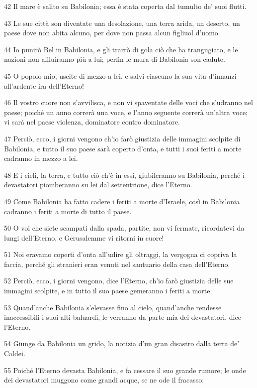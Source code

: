 \par 42 Il mare è salito su Babilonia; essa è stata coperta dal tumulto de' suoi flutti.
\par 43 Le sue città son diventate una desolazione, una terra arida, un deserto, un paese dove non abita alcuno, per dove non passa alcun figliuol d'uomo.
\par 44 Io punirò Bel in Babilonia, e gli trarrò di gola ciò che ha trangugiato, e le nazioni non affluiranno più a lui; perfin le mura di Babilonia son cadute.
\par 45 O popolo mio, uscite di mezzo a lei, e salvi ciascuno la sua vita d'innanzi all'ardente ira dell'Eterno!
\par 46 Il vostro cuore non s'avvilisca, e non vi spaventate delle voci che s'udranno nel paese; poiché un anno correrà una voce, e l'anno seguente correrà un'altra voce; vi sarà nel paese violenza, dominatore contro dominatore.
\par 47 Perciò, ecco, i giorni vengono ch'io farò giustizia delle immagini scolpite di Babilonia, e tutto il suo paese sarà coperto d'onta, e tutti i suoi feriti a morte cadranno in mezzo a lei.
\par 48 E i cieli, la terra, e tutto ciò ch'è in essi, giubileranno su Babilonia, perché i devastatori piomberanno su lei dal settentrione, dice l'Eterno.
\par 49 Come Babilonia ha fatto cadere i feriti a morte d'Israele, così in Babilonia cadranno i feriti a morte di tutto il paese.
\par 50 O voi che siete scampati dalla spada, partite, non vi fermate, ricordatevi da lungi dell'Eterno, e Gerusalemme vi ritorni in cuore!
\par 51 Noi eravamo coperti d'onta all'udire gli oltraggi, la vergogna ci copriva la faccia, perché gli stranieri eran venuti nel santuario della casa dell'Eterno.
\par 52 Perciò, ecco, i giorni vengono, dice l'Eterno, ch'io farò giustizia delle sue immagini scolpite, e in tutto il suo paese gemeranno i feriti a morte.
\par 53 Quand'anche Babilonia s'elevasse fino al cielo, quand'anche rendesse inaccessibili i suoi alti baluardi, le verranno da parte mia dei devastatori, dice l'Eterno.
\par 54 Giunge da Babilonia un grido, la notizia d'un gran disastro dalla terra de' Caldei.
\par 55 Poiché l'Eterno devasta Babilonia, e fa cessare il suo grande rumore; le onde dei devastatori muggono come grandi acque, se ne ode il fracasso;
